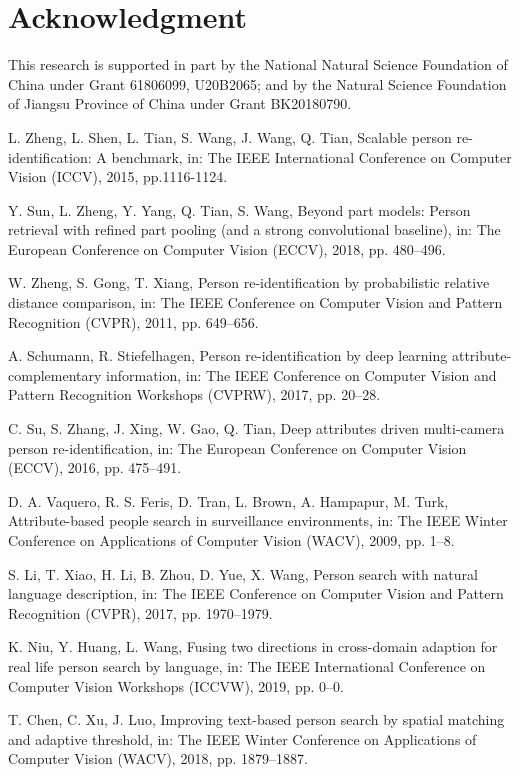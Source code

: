 \documentclass[review]{elsarticle}
\begin{document}
\section*{Acknowledgment}
This research is supported in part by the National Natural Science Foundation of China under Grant 61806099, U20B2065; and by the Natural Science Foundation of Jiangsu Province of China under Grant BK20180790.

\begin{thebibliography}{1}
L. Zheng, L. Shen, L. Tian, S. Wang, J. Wang, Q. Tian, Scalable person re-identification: A benchmark, in: The IEEE International Conference on Computer Vision (ICCV), 2015, pp.1116-1124.

Y. Sun, L. Zheng, Y. Yang, Q. Tian, S. Wang, Beyond part models: Person retrieval with refined part pooling (and a strong convolutional baseline), in:
The European Conference on Computer Vision (ECCV), 2018, pp. 480–496.

W. Zheng, S. Gong, T. Xiang, Person re-identification by probabilistic relative distance comparison, in: The IEEE Conference on Computer Vision and Pattern Recognition (CVPR), 2011, pp. 649–656.

A. Schumann, R. Stiefelhagen, Person re-identification by deep learning attribute-complementary information, in: The IEEE Conference on Computer Vision and Pattern Recognition Workshops (CVPRW), 2017, pp. 20–28.

C. Su, S. Zhang, J. Xing, W. Gao, Q. Tian, Deep attributes driven multi-camera person re-identification, in: The European Conference on Computer Vision (ECCV), 2016, pp. 475–491.

D. A. Vaquero, R. S. Feris, D. Tran, L. Brown, A. Hampapur, M. Turk, Attribute-based people search in surveillance environments, in: The IEEE Winter Conference on Applications of Computer Vision (WACV), 2009, pp. 1–8.

S. Li, T. Xiao, H. Li, B. Zhou, D. Yue, X. Wang, Person search with natural language description, in: The IEEE Conference on Computer Vision and Pattern Recognition (CVPR), 2017, pp. 1970–1979.

K. Niu, Y. Huang, L. Wang, Fusing two directions in cross-domain adaption for real life person search by language, in: The IEEE International Conference on Computer Vision Workshops (ICCVW), 2019, pp. 0–0.

T. Chen, C. Xu, J. Luo, Improving text-based person search by spatial matching and adaptive threshold, in: The IEEE Winter Conference on Applications of Computer Vision (WACV), 2018, pp. 1879–1887.


\end{thebibliography}
\end{document}
